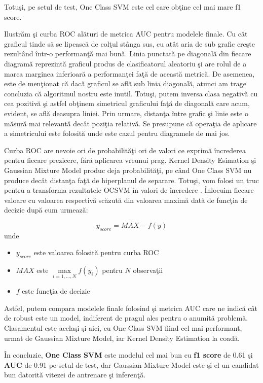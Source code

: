 Totuşi, pe setul de test, One Class SVM este cel care obţine cel mai mare f1 score.

Ilustrăm şi curba ROC alături de metrica AUC pentru modelele finale. Cu cât graficul 
tinde să se lipească de colţul stânga sus, cu atât aria de sub grafic creşte rezultând 
într-o performanţă mai bună. Linia punctată pe diagonală 
din fiecare diagramă reprezintă graficul produs de clasificatorul aleatoriu şi are rolul
de a marca marginea inferioară a performanţei faţă de această metrică. De asemenea, este 
de menţionat că dacă graficul se află sub linia diagonală, atunci am trage concluzia că
algoritmul nostru este inutil. Totuşi, putem inversa clasa negativă cu cea pozitivă şi 
astfel obţinem simetricul graficului faţă de diagonală care acum, evident, se află deasupra
liniei. Prin urmare, distanţa între grafic şi linie este o măsură mai relevantă decât poziţia
relativă. Se presupune că operaţia de aplicare a simetricului este folosită unde este cazul 
pentru diagramele de mai jos.

Curba ROC are nevoie ori de probabilităţi ori de valori ce exprimă încrederea pentru fiecare 
prezicere, fără aplicarea vreunui prag. Kernel Density Esimation şi Gaussian Mixture Model 
produc deja probabilităţi, pe când One Class SVM nu produce decât distanţa faţă de hiperplanul
de separare. Totuşi, vom folosi un truc pentru a transforma rezultatele OCSVM în valori 
de încredere \cite{stackoverflow-auc}. Înlocuim fiecare valoare cu valoarea respectivă scăzută din valoarea maximă
dată de funcţia de decizie după cum urmează:

$$y_{score} = MAX - f(y)$$
unde 

\begin{itemize}
    \item $y_{score}$ este valoarea folosită pentru curba ROC
    \item $MAX$ este $\underset{i=1,\dots,N}{\max} f(y_{i})$ pentru $N$ observaţii
    \item $f$ este funcţia de decizie 
\end{itemize}

Astfel, putem compara modelele finale folosind şi metrica AUC care ne 
indică cât de robust este un model, indiferent de pragul ales pentru 
o anumită problemă. Clasamentul este acelaşi şi aici,
cu One Class SVM fiind cel mai performant, urmat de Gaussian Mixture
Model, iar Kernel Density Estimation la coadă.

În concluzie, \textbf{One Class SVM} este modelul cel mai bun cu \textbf{f1 score}
de 0.61 şi 
\textbf{AUC} de 0.91 pe setul de test, 
dar Gaussian Mixture Model este şi el un candidat
bun datorită vitezei de antrenare şi inferenţă.

